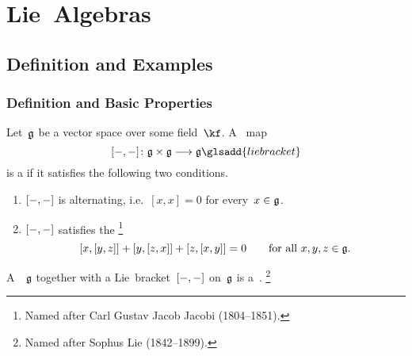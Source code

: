 \chapter{Lie~Algebras}













\section{Definition and Examples}


\subsection{Definition and Basic Properties}


\begin{definition}
	Let~$\mathfrak{g}$ be a vector space over some field~$\kf$.
	A~{\bilinear{$\kf$}} map
	\[
		[\ph, \ph]
		\colon
		\glie \times \glie
		\to
		\glie
		\glsadd{lie bracket}
	\]
	is a  if it satisfies the following two conditions.
	\begin{enumerate}
		\item
		$[-, -]$ is alternating, i.e.~$[x,x] = 0$ for every~$x \in \mathfrak{g}$.
		\item
		$[-, -]$ satisfies the %
		\footnote{
			Named after Carl Gustav Jacob Jacobi (1804--1851).
		}
		\[
			[x,[y,z]] + [y,[z,x]] + [z,[x,y]]
			=
			0
			\qquad
			\text{for all~$x, y, z \in \mathfrak{g}$.}
		\]
	\end{enumerate}
	A~{\vectorspace{$\kf$}}~$\mathfrak{g}$ together with a Lie~bracket~$[-, -]$ on~$\mathfrak{g}$ is a~.%
	\footnote{
		Named after Sophus Lie (1842--1899).
	}
\end{definition}


